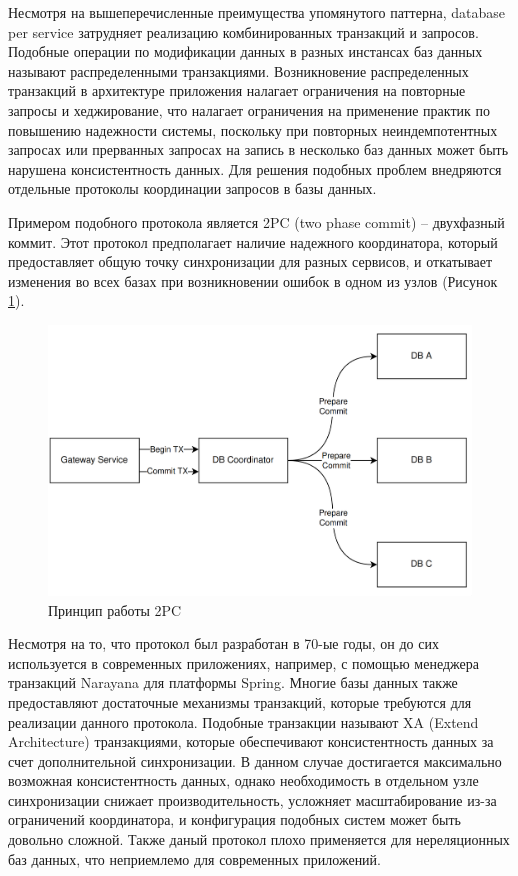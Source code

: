 Несмотря на вышеперечисленные преимущества упомянутого паттерна, database per service затрудняет реализацию комбинированных транзакций и запросов. 
Подобные операции по модификации данных в разных инстансах баз данных называют распределенными транзакциями.
Возникновение распределенных транзакций в архитектуре приложения налагает ограничения на повторные запросы и хеджирование, что налагает
ограничения на применение практик по повышению надежности системы, поскольку при повторных неиндемпотентных запросах или прерванных запросах на запись в несколько баз данных
может быть нарушена консистентность данных.
Для решения подобных проблем внедряются отдельные протоколы координации запросов в базы данных.

Примером подобного протокола является 2PC (two phase commit) -- двухфазный коммит. Этот протокол предполагает
наличие надежного координатора, который предоставляет общую точку синхронизации для разных сервисов, и откатывает изменения
во всех базах при возникновении ошибок в одном из узлов (Рисунок \ref{fig:twopc}).
\begin{figure}[H]
    \centering
    \includegraphics[width=0.8\linewidth]{img/2pc.png}
    \caption{Принцип работы 2PC}
    \label{fig:twopc}
\end{figure}

Несмотря на то, что протокол был разработан в 70-ые годы, он до сих используется в современных приложениях, например,
с помощью менеджера транзакций Narayana для платформы Spring. Многие базы данных также предоставляют достаточные механизмы транзакций, которые
требуются для реализации данного протокола. Подобные транзакции называют XA (Extend Architecture) транзакциями, которые обеспечивают
консистентность данных за счет дополнительной синхронизации.
В данном случае достигается максимально возможная консистентность данных, однако
необходимость в отдельном узле синхронизации снижает производительность, усложняет масштабирование из-за ограничений координатора, и конфигурация подобных систем
может быть довольно сложной.
Также даный протокол плохо применяется
для нереляционных баз данных, что неприемлемо для современных приложений.

